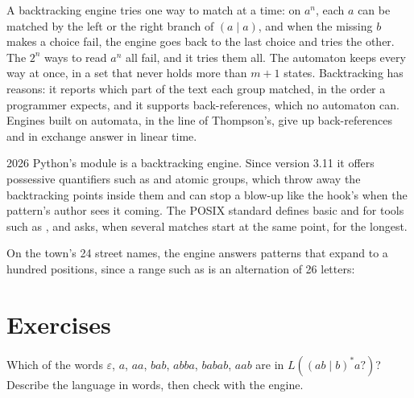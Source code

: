 A backtracking engine tries one way to match at a time: on $a^n$, each $a$ can be matched by the left or the right
branch of $(a \mid a)$, and when the missing $b$ makes a choice fail, the engine goes back to the last choice and tries
the other. The $2^n$ ways to read $a^n$ all fail, and it tries them all. The automaton keeps every way at once, in a
set that never holds more than $m + 1$ states. Backtracking has reasons: it reports which part of the text each group
matched, in the order a programmer expects, and it supports back-references, which no automaton can. Engines built on
automata, in the line of Thompson's, give up back-references and in exchange answer in linear time.

\begin{dated}{2026}
Python's  module is a backtracking engine. Since version 3.11 it offers possessive quantifiers such as
 and atomic groups, which throw away the backtracking points inside them and can stop a blow-up like the
hook's when the pattern's author sees it coming. The POSIX standard defines basic and  for
tools such as , and asks, when several matches start at the same point, for the longest.
\end{dated}

On the town's 24 street names, the engine answers patterns that expand to a hundred positions, since a range such as
\code{[A-Z]} is an alternation of 26 letters:

\label{lst:b2:regular-languages:streets}

\label{out:b2:regular-languages:streets}

\section{Exercises}\label{sec:b2:regular-languages:exercises}

\begin{exercise}[$\star$]\label{exo:b2:regular-languages:1}
Which of the words $\varepsilon$, $a$, $aa$, $bab$, $abba$, $babab$, $aab$ are in $L((ab \mid b)^*a?)$? Describe the
language in words, then check with the engine.
\end{exercise}

